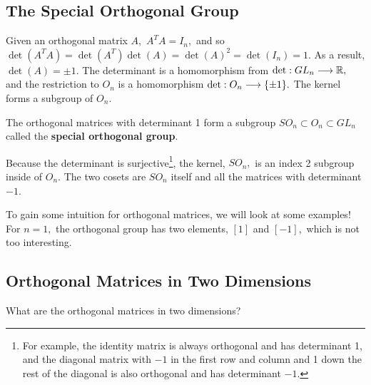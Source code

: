 \subsection{The Special Orthogonal Group}

Given an orthogonal matrix $A,$ $A^TA = I_n,$ and so $\det(A^TA) = \det(A^T)\det(A) = \det(A)^2 = \det(I_n) = 1.$ As a result, $\det(A) = \pm 1.$ The determinant is a homomorphism from $\det: GL_n \longrightarrow \mathbb R,$ and the restriction to $O_n$ is a homomorphism $\det: O_n \longrightarrow \{\pm 1\}.$ The kernel forms a subgroup of $O_n.$

\begin{definition}
The orthogonal matrices with determinant 1 form a subgroup $SO_n \subset O_n \subset GL_n$ called the \textbf{special orthogonal group}.
\end{definition}

Because the determinant is surjective\footnote{For example, the identity matrix is always orthogonal and has determinant 1, and the diagonal matrix with $-1$ in the first row and column and 1 down the rest of the diagonal is also orthogonal and has determinant $-1$.}, the kernel, $SO_n,$ is an index 2 subgroup inside of $O_n.$ The two cosets are $SO_n$ itself and all the matrices with determinant $-1.$

To gain some intuition for orthogonal matrices, we will look at some examples! For $n = 1,$ the orthogonal group has two elements, $[1]$ and $[-1],$ which is not too interesting.

\subsection{Orthogonal Matrices in Two Dimensions}
What are the orthogonal matrices in two dimensions?

